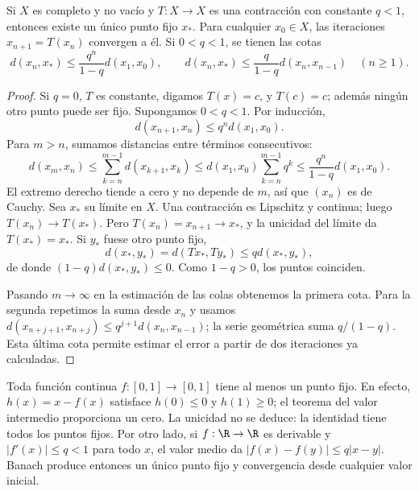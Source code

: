 \begin{teorema}\label{ch11:banach}
Si $X$ es completo y no vacío y $T:X\to X$ es una contracción con constante $q<1$, entonces existe un único punto fijo $x_*$. Para cualquier $x_0\in X$, las iteraciones $x_{n+1}=T(x_n)$ convergen a él. Si $0<q<1$, se tienen las cotas
\[
 d(x_n,x_*)\leq\frac{q^n}{1-q}d(x_1,x_0),
 \qquad d(x_n,x_*)\leq\frac{q}{1-q}d(x_n,x_{n-1})\quad(n\geq1).
\]
\end{teorema}
\begin{proof}
Si $q=0$, $T$ es constante, digamos $T(x)=c$, y $T(c)=c$; además ningún otro punto puede ser fijo. Supongamos $0<q<1$. Por inducción,
\[
 d(x_{n+1},x_n)\leq q^nd(x_1,x_0).
\]
Para $m>n$, sumamos distancias entre términos consecutivos:
\[
 d(x_m,x_n)\leq\sum_{k=n}^{m-1}d(x_{k+1},x_k)
 \leq d(x_1,x_0)\sum_{k=n}^{m-1}q^k
 \leq\frac{q^n}{1-q}d(x_1,x_0).
\]
El extremo derecho tiende a cero y no depende de $m$, así que $(x_n)$ es de Cauchy. Sea $x_*$ su límite en $X$. Una contracción es Lipschitz y continua; luego $T(x_n)\to T(x_*)$. Pero $T(x_n)=x_{n+1}\to x_*$, y la unicidad del límite da $T(x_*)=x_*$. Si $y_*$ fuese otro punto fijo,
\[
 d(x_*,y_*)=d(Tx_*,Ty_*)\leq qd(x_*,y_*),
\]
de donde $(1-q)d(x_*,y_*)\leq0$. Como $1-q>0$, los puntos coinciden.

Pasando $m\to\infty$ en la estimación de las colas obtenemos la primera cota. Para la segunda repetimos la suma desde $x_n$ y usamos $d(x_{n+j+1},x_{n+j})\leq q^{j+1}d(x_n,x_{n-1})$; la serie geométrica suma $q/(1-q)$. Esta última cota permite estimar el error a partir de dos iteraciones ya calculadas.
\end{proof}

\begin{ejemplo}
Toda función continua $f:[0,1]\to[0,1]$ tiene al menos un punto fijo. En efecto, $h(x)=x-f(x)$ satisface $h(0)\leq0$ y $h(1)\geq0$; el teorema del valor intermedio proporciona un cero. La unicidad no se deduce: la identidad tiene todos los puntos fijos. Por otro lado, si $f:\R\to\R$ es derivable y $|f'(x)|\leq q<1$ para todo $x$, el valor medio da $|f(x)-f(y)|\leq q|x-y|$. Banach produce entonces un único punto fijo y convergencia desde cualquier valor inicial.
\end{ejemplo}

